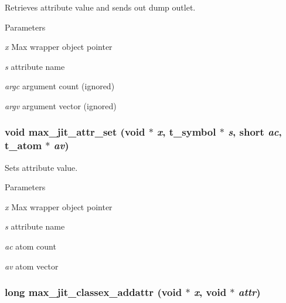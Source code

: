 Retrieves attribute value and sends out dump outlet. 
\begin{DoxyParams}{Parameters}
\item[{\em x}]Max wrapper object pointer \item[{\em s}]attribute name \item[{\em argc}]argument count (ignored) \item[{\em argv}]argument vector (ignored) \end{DoxyParams}
\hypertarget{group__maxwrapmod_ga022ce3be027665efbf00bcef827c4237}{
\subsubsection[{max\_\-jit\_\-attr\_\-set}]{\setlength{\rightskip}{0pt plus 5cm}void max\_\-jit\_\-attr\_\-set (void $\ast$ {\em x}, \/  {\bf t\_\-symbol} $\ast$ {\em s}, \/  short {\em ac}, \/  {\bf t\_\-atom} $\ast$ {\em av})}}
\label{group__maxwrapmod_ga022ce3be027665efbf00bcef827c4237}


Sets attribute value. 
\begin{DoxyParams}{Parameters}
\item[{\em x}]Max wrapper object pointer \item[{\em s}]attribute name \item[{\em ac}]atom count \item[{\em av}]atom vector \end{DoxyParams}
\hypertarget{group__maxwrapmod_ga888aa461197db2e7ef2fb0ae34479c3e}{
\subsubsection[{max\_\-jit\_\-classex\_\-addattr}]{\setlength{\rightskip}{0pt plus 5cm}long max\_\-jit\_\-classex\_\-addattr (void $\ast$ {\em x}, \/  void $\ast$ {\em attr})}}
\label{group__maxwrapmod_ga888aa461197db2e7ef2fb0ae34479c3e}


